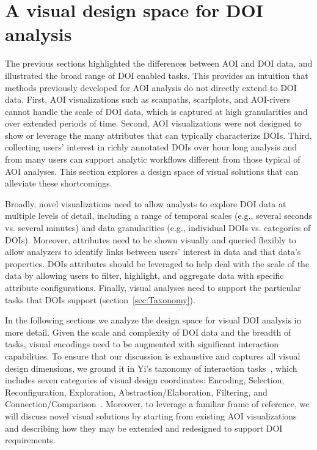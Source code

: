 \section{A visual design space for DOI analysis}
The previous sections highlighted the differences between AOI and DOI data, and illustrated the broad range of DOI enabled tasks. This provides an intuition that methods previously developed for AOI analysis do not directly extend to DOI data. First, AOI visualizations such as scanpaths, scarfplots, and AOI-rivers cannot handle the scale of DOI data, which is captured at high granularities and over extended periods of time. Second, AOI visualizations were not designed to show or leverage the many attributes that can typically characterize DOIs.  Third, collecting users' interest in richly annotated DOIs over hour long analysis and from many users can support analytic workflows different from those typical of AOI analyses. This section explores a design space of visual solutions that can alleviate these shortcomings.

Broadly, novel visualizations need to allow analysts to explore DOI data at multiple levels of detail, including a range of temporal scales (e.g., several seconds vs. several minutes) and data granularities (e.g., individual DOIs vs. categories of DOIs).  Moreover, attributes need to be shown visually and queried flexibly to allow analyzers to identify links between users' interest in data and that data's properties. DOIs attributes should be leveraged to help deal with the scale of the data by allowing users to filter, highlight, and aggregate data with specific attribute configurations. Finally, visual analyses need to support the particular tasks that DOIs support (section~\ref{sec:Taxonomy}). 

In the following sections we analyze the design space for visual DOI analysis in more detail. Given the scale and complexity of DOI data and the breadth of tasks, visual encodings need to be augmented with significant interaction capabilities. To ensure that our discussion is exhaustive and captures all visual design dimensions, we ground it in Yi's taxonomy of interaction tasks~\cite{yi2007toward}, which includes seven categories of visual design coordinates: Encoding, Selection, Reconfiguration, Exploration, Abstraction/Elaboration, Filtering, and Connection/Comparison~\cite{yi2007toward}. Moreover, to leverage a familiar frame of reference, we will discuss novel visual solutions by starting from existing AOI visualizations and describing how they may be extended and redesigned to support DOI requirements. 

